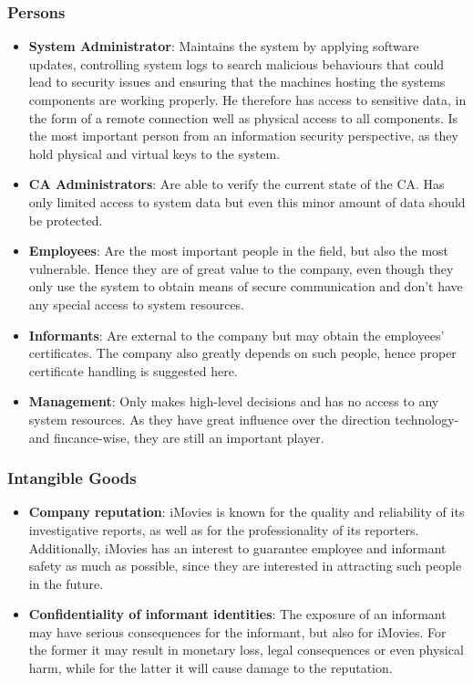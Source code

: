 \documentclass[english]{article}
\begin{document}
\subsubsection{\textbf{Persons}}
\begin{itemize}
\item \textbf{System Administrator}: Maintains the system by applying software updates, controlling system logs to search malicious behaviours that could lead to security issues and ensuring that the machines hosting the
systems components are working properly. He therefore has access to sensitive data, in the form of a remote connection well as physical access to all components. Is the most important person from an information security
perspective, as they hold physical and virtual keys to the system.
\item \textbf{CA Administrators}: Are able to verify the current state of the CA. Has only limited access to system data but even this minor amount of data should be protected.
\item \textbf{Employees}: Are the most important people in the field, but also the most vulnerable. Hence they are of great value to the company, even though they only use the system to obtain means of secure communication and
don't have any special access to system resources.
\item \textbf{Informants}: Are external to the company but may obtain the employees' certificates. The company also greatly depends on such people, hence proper certificate handling is suggested here.
\item \textbf{Management}: Only makes high-level decisions and has no access to any system resources. As they have great influence over the direction technology- and fincance-wise, they are still
an important player.
\end{itemize}

\subsubsection{\textbf{Intangible Goods}}
\begin{itemize}
\item \textbf{Company reputation}: iMovies is known for the quality and reliability of its investigative reports, as well as for the professionality of its reporters. Additionally, iMovies has an interest to guarantee employee and 
informant safety as much as possible, since they are interested in attracting such people in the future.
\item \textbf{Confidentiality of informant identities}: The exposure of an informant may have serious consequences for the informant, but also for iMovies. For the former it may result in monetary loss, legal consequences or even 
physical harm, while for the latter it will cause damage to the reputation.
\end{itemize}
\end{document}
